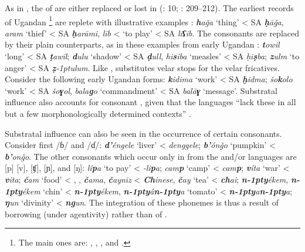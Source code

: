 \documentclass[output=paper]{langsci/langscibook}
\begin{document}
As in  , the  of  are either replaced or lost in  (\citealt{Owens1985}: 10; \citealt{Wellens2003}: 209–212). The earliest records of Ugandan \footnote{The main ones are: \citet{Cook1905}, \citet{Jenkins1909}, \citet{Meldon1913}, and \citet{OwenKeane1915}.} are replete with illustrative examples \citep{Avram2017talk}: \textit{\textbf{h}aǧa} ‘thing’ < SA \textit{\textbf{ḥ}āǧa}, \textit{aram} ‘thief’ < SA \textit{\textbf{ḥ}arāmi}, \textit{līb} < ‘to play’ < SA \textit{li\textbf{ʕ}ib}. The  consonants are replaced by their plain counterparts, as in these examples from early Ugandan : \textit{\textbf{t}owil} ‘long’ < SA \textit{\textbf{ṭ}awīl}; \textit{\textbf{d}ulu} ‘shadow’ < SA \textit{\textbf{ḍ}ull}, \textit{hi\textbf{s}iba} ‘measles’ < SA \textit{ḥi\textbf{ṣ}ba}; \textit{\textbf{z}ulm} ‘to anger’ < SA \textit{\textbf{ẓ}\kern -1ptulum}. Like  ,  substitutes velar stops for the  velar fricatives. Consider the following early Ugandan  forms: \textit{\textbf{k}idima} ‘work’ < SA \textit{\textbf{ḫ}idma}; \textit{šo\textbf{k}olo} ‘work’ < SA \textit{šo\textbf{ɣ}ol}, \textit{bala\textbf{g}o} ‘commandment’ < SA \textit{balā\textbf{ɣ}} ‘message’. Substratal influence also accounts for consonant , given that the  languages “lack these in all but a few morphonologically determined contexts” \citep[162]{Owens1997}. 

Substratal influence can also be seen in the occurrence of certain consonants. Consider first /ɓ/ and /ɗ/:   \textit{\textbf{d'}éngele} ‘liver’ <  \textit{denggele};   \textit{\textbf{b'}ónǧo} ‘pumpkin’ <  \textit{\textbf{b'}onǧo}. The other consonants which occur only in  from the  and/or  languages are [p] [v], [ʧ], [ɲ], and [ŋ]:  \textit{lí\textbf{p}a} ‘to pay’ <  \textit{-li\textbf{p}a};  \textit{cam\textbf{p}} ‘camp’ <  \textit{cam\textbf{p}};  \textit{\textbf{v}íta} ‘war’ <  \textit{\textbf{v}ita};   \textit{\textbf{č}am} ‘food’ < , ,  \textit{\textbf{č}ama},   \textit{\textbf{č}ayniz} <  \textit{\textbf{Ch}inese},  \textit{\textbf{č}ay} ‘tea’ <  \textit{\textbf{ch}ai};   \textit{\textbf{n\kern -1pty}ékem},  \textit{\textbf{n\kern -1pty}ékem} ‘chin’ <  \textit{\textbf{n\kern -1pty}ékem},  \textit{\textbf{n\kern -1pty}á\textbf{n\kern -1pty}a} ‘tomato’ <  \textit{\textbf{n\kern -1pty}a\textbf{n\kern -1pty}a};   \textit{\textbf{ŋ}un} ‘divinity’ <  \textit{\textbf{ng}un}. The integration of these phonemes is thus a result of borrowing (under  agentivity) rather than of .
\end{document}
